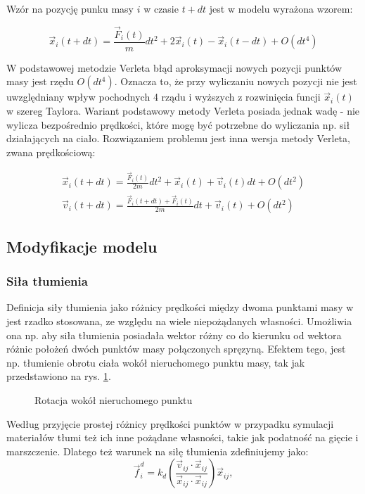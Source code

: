 Wzór na pozycję punku masy $i$ w czasie $t + dt$ jest w modelu wyrażona wzorem:

\begin{equation}
\vec{x}_i(t + dt) = \frac{\vec{F}_i(t)}{m} dt^2 + 2\vec{x}_i(t) - \vec{x}_i(t -
		dt) + O(dt^4)
\end{equation}

W podstawowej metodzie Verleta błąd aproksymacji nowych pozycji punktów masy
jest rzędu $O(dt^4)$. Oznacza to, że przy wyliczaniu nowych pozycji nie jest
uwzględniany wpływ pochodnych 4 rządu i wyższych z rozwinięcia funcji
$\vec{x}_i(t)$ w szereg Taylora. Wariant podstawowy metody Verleta posiada
 jednak wadę - nie wylicza bezpośrednio prędkości, które mogę być potrzebne do
 wyliczania np. sił działających na ciało. Rozwiązaniem problemu jest inna
 wersja metody Verleta, zwana prędkościową:

\begin{eqnarray}
\vec{x}_i(t + dt) = \frac{\vec{F}_i(t)}{2m} dt^2 + \vec{x}_i(t) + \vec{v}_i(t)dt
+ O(dt^2)\\
\vec{v}_i(t + dt) = \frac{\vec{F}_i(t + dt) + \vec{F}_i(t)}{2m}dt + \vec{v}_i(t)
+ O(dt^2)
\end{eqnarray}

%
%
\subsection{Modyfikacje modelu}

\subsubsection{Siła tłumienia}
Definicja siły tłumienia jako różnicy prędkości między dwoma punktami masy w
jest rzadko stosowana, ze względu na wiele niepożądanych
własności. Umożliwia ona np. aby siła tłumienia posiadała wektor różny co do
kierunku od wektora różnic położeń dwóch punktów masy połączonych spręzyną.
Efektem tego, jest np. tłumienie obrotu ciała wokół nieruchomego punktu masy, tak jak
przedstawiono na rys. \ref{tlumienie}.

\begin{figure}[ht]
\centering

\caption{Rotacja wokół nieruchomego punktu}
\label{tlumienie}
\end{figure}

Według \cite{pbdo} przyjęcie prostej różnicy prędkości punktów w przypadku
symulacji materiałów tłumi też ich inne pożądane własności, takie jak podatność na gięcie
i marszczenie. Dlatego też warunek na siłę tłumienia zdefiniujemy jako:
\begin{equation}
\vec{f}^{d}_i = k_d (\frac{\vec{v}_{ij} \cdot
		\vec{x}_{ij}}{\vec{x}_{ij} \cdot \vec{x}_{ij}}) \vec{x}_{ij},
\end{equation}

